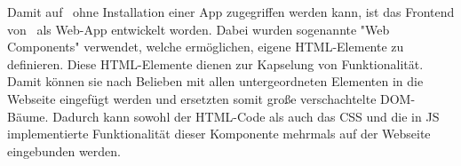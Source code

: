 \label{sec:webcomponents}

Damit auf \ZELIA\ ohne Installation einer App zugegriffen werden kann, ist das Frontend von \ZELIA\ als Web-App entwickelt worden. Dabei wurden sogenannte "Web Components" verwendet, welche ermöglichen, eigene HTML-Elemente zu definieren. Diese HTML-Elemente dienen zur Kapselung von Funktionalität. Damit können sie nach Belieben mit allen untergeordneten Elementen in die Webseite eingefügt werden und ersetzten somit große verschachtelte DOM-Bäume. Dadurch kann sowohl der HTML-Code als auch das CSS und die in JS implementierte Funktionalität dieser Komponente mehrmals auf der Webseite eingebunden werden. \cite{MDNWebCustomElements}


\pagebreak
